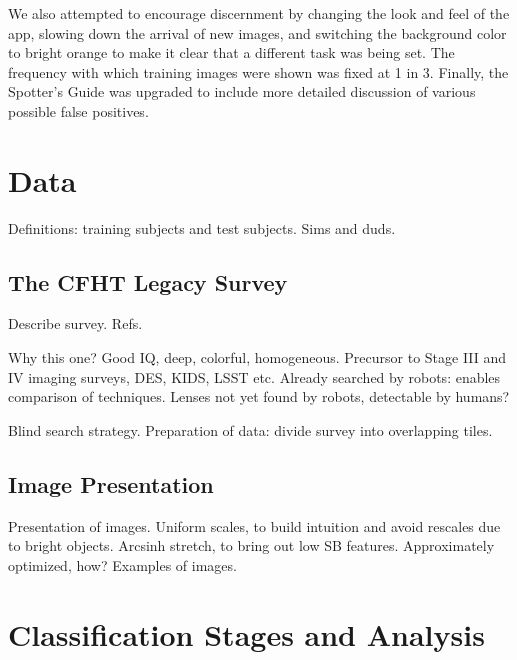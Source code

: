 \documentclass[useAMS,usenatbib,a4paper]{mn2e}
\begin{document}

We also attempted to encourage discernment by changing the look and feel of
the app, slowing down the arrival of new images, and switching the background
color to bright orange to make it clear that a different task was being set.
The frequency with which training images were shown was fixed at 1 in 3.
Finally, the Spotter's Guide was upgraded to include more detailed discussion
of various possible false positives.



\section{Data}
\label{sec:data}

Definitions: training subjects and test subjects. Sims and duds.


\subsection{The CFHT Legacy Survey}
\label{sec:data:CFHTLS}

Describe survey. Refs. 

Why this one? Good IQ, deep, colorful, homogeneous. Precursor to Stage III and
IV imaging surveys, DES, KIDS, LSST etc. Already searched by robots: enables
comparison of techniques. Lenses not yet found by robots, detectable by
humans? 

Blind search strategy.
Preparation of data: divide survey into overlapping tiles. 



\subsection{Image Presentation}
\label{sec:data:display}

Presentation of images. Uniform scales, to build intuition and avoid rescales
due to bright objects. Arcsinh stretch, to bring out low SB features. 
Approximately optimized, how? Examples of images.



\section{Classification Stages and Analysis}
\label{sec:swap}
\end{document}
